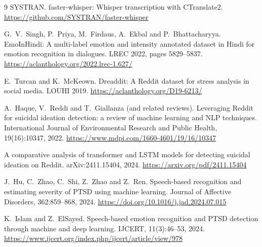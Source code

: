 \documentclass[11pt,a4paper]{article}
\begin{document}
\begin{thebibliography}{9}
SYSTRAN. faster-whisper: Whisper transcription with CTranslate2.
\url{https://github.com/SYSTRAN/faster-whisper}

G.~V.~Singh, P.~Priya, M.~Firdaus, A.~Ekbal and P.~Bhattacharyya.
EmoInHindi: A multi-label emotion and intensity annotated dataset in Hindi for emotion recognition in
dialogues. LREC 2022, pages 5829--5837.
\url{https://aclanthology.org/2022.lrec-1.627/}

E.~Turcan and K.~McKeown.
Dreaddit: A Reddit dataset for stress analysis in social media. LOUHI 2019.
\url{https://aclanthology.org/D19-6213/}

A.~Haque, V.~Reddi and T.~Giallanza (and related reviews).
Leveraging Reddit for suicidal ideation detection: a review of machine learning and NLP techniques.
International Journal of Environmental Research and Public Health, 19(16):10347, 2022.
\url{https://www.mdpi.com/1660-4601/19/16/10347}

A comparative analysis of transformer and LSTM models for detecting suicidal ideation on Reddit.
arXiv:2411.15404, 2024.
\url{https://arxiv.org/pdf/2411.15404}

J.~Hu, C.~Zhao, C.~Shi, Z.~Zhao and Z.~Ren.
Speech-based recognition and estimating severity of PTSD using machine learning.
Journal of Affective Disorders, 362:859--868, 2024.
\url{https://doi.org/10.1016/j.jad.2024.07.015}

K.~Islam and Z.~ElSayed.
Speech-based emotion recognition and PTSD detection through machine and deep learning.
IJCERT, 11(3):46--53, 2024.
\url{https://www.ijcert.org/index.php/ijcert/article/view/978}

\end{thebibliography}

\end{document}
